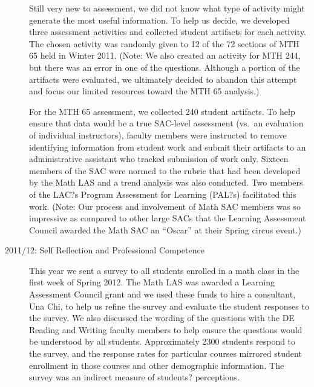 \begin{description}
Still very new to assessment, we did not know what type of activity might generate the most useful information.  To help us decide, we developed three assessment activities and collected student artifacts for each activity.  The chosen activity was randomly given to 12 of the 72 sections of MTH 65 held in Winter 2011.  (Note: We also created an activity for MTH 244, but there was an error in one of the questions.  Although a portion of the artifacts were evaluated, we ultimately decided to abandon this attempt and focus our limited resources toward the MTH 65 analysis.)

For the MTH 65 assessment, we collected 240 student artifacts.  To help ensure that data would be a true SAC-level assessment (vs.\ an evaluation of individual instructors), faculty members were instructed to remove identifying information from student work and submit their artifacts to an administrative assistant who tracked submission of work only.  Sixteen members of the SAC were normed to the rubric that had been developed by the Math LAS and a trend analysis was also conducted.  Two members of the LAC?s Program Assessment for Learning (PAL?s) facilitated this work.  (Note: Our process and involvement of Math SAC members was so impressive as compared to other large SACs that the Learning Assessment Council awarded the Math SAC an ``Oscar'' at their Spring circus event.)

\item[2011/12: Self Reflection and Professional Competence]

This year we sent a survey to all students enrolled in a math class in the first week of Spring 2012.  The Math LAS was awarded a Learning Assessment Council grant and we used these funds to hire a consultant, Una Chi, to help us refine the survey and evaluate the student responses to the survey.  We also discussed the wording of the questions with the DE Reading and Writing faculty members to help ensure the questions would be understood by all students. Approximately 2300 students respond to the survey, and the response rates for particular courses mirrored student enrollment in those courses and other demographic information.  The survey was an indirect measure of students? perceptions.  


\end{description}
